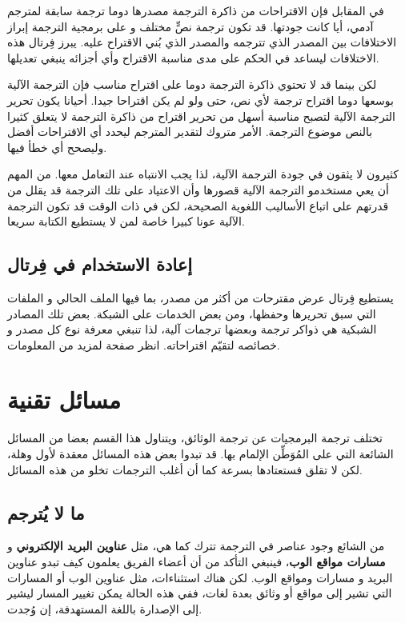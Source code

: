 في المقابل فإن الاقتراحات من ذاكرة الترجمة مصدرها دوما ترجمة سابقة
لمترجم آدمي، أيا كانت جودتها. قد تكون ترجمة نصٍّ مختلف و على برمجية
الترجمة إبراز الاختلافات بين المصدر الذي تترجمه والمصدر الذي بُني
الاقتراح عليه. يبرز فِرتال هذه الاختلافات ليساعد في الحكم على مدى
مناسبة الاقتراح وأي أجزائه ينبغي تعديلها.

لكن بينما قد لا تحتوي ذاكرة الترجمة دوما على اقتراح مناسب فإن الترجمة
الآلية بوسعها دوما اقتراح ترجمة لأي نص، حتى ولو لم يكن اقتراحا جيدا.
أحيانا يكون تحرير الترجمة الآلية لتصبح مناسبة أسهل من تحرير اقتراح من
ذاكرة الترجمة لا يتعلق كثيرا بالنص موضوع الترجمة. الأمر متروك لتقدير
المترجم ليحدد أي الاقتراحات أفضل وليصحح أي خطأ فيها.

كثيرون لا يثقون في جودة الترجمة الآلية، لذا يجب الانتباه عند التعامل
معها. من المهم أن يعي مستخدمو الترجمة الآلية قصورها وأن الاعتياد على
تلك الترجمة قد يقلل من قدرتهم على اتباع الأساليب اللغوية الصحيحة، لكن
في ذات الوقت قد تكون الترجمة الآلية عونا كبيرا خاصة لمن لا يستطيع
الكتابة سريعا.

\section{إعادة الاستخدام في فِرتال}
يستطيع فِرتال عرض مقترحات من أكثر من مصدر، بما فيها الملف الحالي و
الملفات التي سبق تحريرها وحفظها، ومن بعض الخدمات على الشبكة. بعض تلك
المصادر الشبكية هي ذواكر ترجمة وبعضها ترجمات آلية، لذا تنبغي معرفة نوع
كل مصدر و خصائصه لتقيّم اقتراحاته. انظر صفحة
\at[ref:36543315] لمزيد من المعلومات.

\chapter[ref:32352020]{مسائل تقنية}
تختلف ترجمة البرمجيات عن ترجمة
الوثائق، ويتناول هذا القسم بعضا من المسائل الشائعة التي على المُوَطِّن
الإلمام بها. قد تبدوا بعض هذه المسائل معقدة لأول وهلة، لكن لا تقلق
فستعتادها بسرعة كما أن أغلب الترجمات تخلو من هذه المسائل.

\section{ما لا يُترجم}
من الشائع وجود عناصر في الترجمة تترك كما هي، مثل {\bf عناوين البريد
الإلكتروني} و {\bf مسارات مواقع الوب}، فينبغي التأكد من أن أعضاء الفريق
يعلمون كيف تبدو عناوين البريد و مسارات ومواقع الوب. لكن هناك استثناءات،
مثل عناوين الوب أو المسارات التي تشير إلى مواقع أو وثائق بعدة لغات، ففي
هذه الحالة يمكن تغيير المسار ليشير إلى الإصدارة باللغة المستهدفة، إن
وُجدت.

